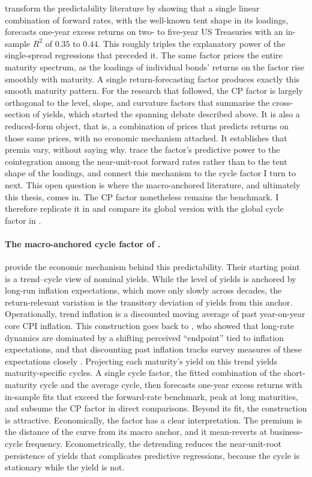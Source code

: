 \citet{cochrane2005} transform the predictability literature by showing
that a single linear combination of forward rates, with the well-known
tent shape in its loadings, forecasts one-year excess returns on two- to
five-year US Treasuries with an in-sample $R^{2}$ of $0.35$ to $0.44$.
This roughly triples the explanatory power of the single-spread
regressions that preceded it. The same factor prices the entire maturity
spectrum, as the loadings of individual bonds' returns on the factor rise
smoothly with maturity. A single return-forecasting factor produces exactly this smooth maturity
pattern. For the
research that followed, the CP factor is largely
orthogonal to the level, slope, and curvature factors
that summarise the cross-section of yields, which started the spanning
debate described above. It is also a reduced-form object, that is,
a combination of prices that predicts returns on those same prices, with
no economic mechanism attached. It establishes that premia vary, without
saying why. \citet{rebonato2025} trace the factor's predictive power to the
cointegration among the near-unit-root forward rates rather than to the
tent shape of the loadings, and connect this mechanism to the cycle factor
I turn to next. This open question is where the macro-anchored literature,
and ultimately this thesis, comes in. The CP factor nonetheless remains the benchmark. I therefore replicate it in 
and compare its global version with the global cycle factor in
.

\paragraph{The macro-anchored cycle factor of \citet{cieslak2015}.}
\label{sec:lit-cp2015}

\citet{cieslak2015} provide the economic mechanism behind this
predictability. Their starting point is a trend--cycle view of nominal
yields. While the level of yields is anchored by long-run inflation
expectations, which move only slowly across decades, the return-relevant
variation is the transitory deviation of yields from this anchor.
Operationally, trend inflation is a discounted moving average of past
year-on-year core CPI inflation. This construction goes back to \citet{kozicki2001}, who
showed that long-rate dynamics are dominated by a shifting perceived
``endpoint'' tied to inflation expectations, and that discounting past
inflation tracks survey measures of these expectations closely
\citep{kozicki2012}.
Projecting each maturity's yield on this trend yields maturity-specific
cycles. A single cycle factor, the fitted combination of
the short-maturity cycle and the average cycle, then forecasts one-year
excess returns with in-sample fits that exceed the forward-rate
benchmark, peak at long maturities, and subsume the CP factor in
direct comparisons. Beyond its fit, the construction is
attractive. Economically, the factor has a clear
interpretation. The premium is the distance of the curve from its macro
anchor, and it mean-reverts at business-cycle frequency.
Econometrically, the detrending reduces the near-unit-root persistence of
yields that complicates predictive regressions, because the cycle is
stationary while the yield is not.

